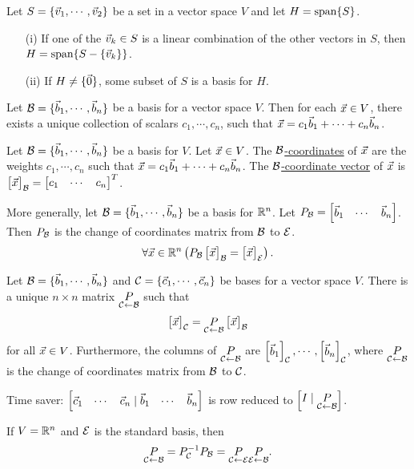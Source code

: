\documentclass[10pt,a4paper]{article}
\begin{document}
\begin{theorem}
	Let $S = \{\vec{v}_1,\cdots,\vec{v}_2\}$ be a set in a vector space $V$ and let $H = \text{span}\{S\}$.
	\begin{enumerate}
		\item[(i)] If one of the $\vec{v}_k\in S$ is a linear combination of the other vectors in $S$, then $H = \text{span}\{S - \{\vec{v}_k\}\}$.
		\item[(ii)] If $H\neq \{\vec{0}\}$, some subset of $S$ is a basis for $H$.
	\end{enumerate}
\end{theorem}

\begin{theorem}
	Let $\mathcal{B} = \{\vec{b}_1,\cdots,\vec{b}_n\}$ be a basis for a vector space $V$. Then for each $\vec{x}\in V$, there exists a unique collection of scalars $c_1,\cdots,c_n$, such that $\vec{x} = c_1 \vec{b}_1 + \cdots + c_n \vec{b}_n$.
\end{theorem}

	Let $\mathcal{B} = \{\vec{b}_1,\cdots,\vec{b}_n\}$ be a basis for $V$. Let $\vec{x} \in V$. The \underline{$\mathcal{B}$-coordinates} of $\vec{x}$ are the weights $c_1,\cdots,c_n$ such that $\vec{x} = c_1 \vec{b}_1 + \cdots + c_n \vec{b}_n$. The \underline{$\mathcal{B}$-coordinate vector} of $\vec{x}$ is $\begin{bmatrix}\vec{x}\end{bmatrix}_{\mathcal{B}} = \begin{bmatrix}c_1&\cdots&c_n\end{bmatrix}^T$.

More generally, let $\mathcal{B} = \{\vec{b}_1,\cdots,\vec{b}_n\}$ be a basis for $\mathbb{R}^n$. Let $P_{\mathcal{B}} = \begin{bmatrix}\vec{b}_1&\cdots&\vec{b}_n\end{bmatrix}$. Then $P_{\mathcal{B}}$ is the change of coordinates matrix from $\mathcal{B}$ to $\mathcal{E}$. 
$$\forall \vec{x}\in \mathbb{R}^n\left(P_{\mathcal{B}} \begin{bmatrix}\vec{x}\end{bmatrix}_{\mathcal{B}} = \begin{bmatrix}\vec{x}\end{bmatrix}_{\mathcal{E}}\right).$$

\begin{theorem}
	Let $\mathcal{B} = \{\vec{b}_1,\cdots,\vec{b}_n\}$ and $\mathcal{C} = \{\vec{c}_1,\cdots,\vec{c}_n\}$ be bases for a vector space $V$. There is a unique $n\times n$ matrix $\underset{\mathcal{C}\leftarrow \mathcal{B}}{P}$ such that $$\begin{bmatrix}\vec{x}\end{bmatrix}_{\mathcal{C}} = \underset{\mathcal{C} \leftarrow \mathcal{B}}{P} \begin{bmatrix}\vec{x}\end{bmatrix}_{\mathcal{B}}$$ for all $\vec{x}\in V$. Furthermore, the columns of $\underset{\mathcal{C}\leftarrow \mathcal{B}}{P}$ are $\begin{bmatrix}\vec{b}_1\end{bmatrix}_{\mathcal{C}},\cdots,\begin{bmatrix}\vec{b}_n\end{bmatrix}_{\mathcal{C}}$, where
	$\underset{\mathcal{C}\leftarrow \mathcal{B}}{P}$ is the change of coordinates matrix from $\mathcal{B}$ to $\mathcal{C}$.
\end{theorem}

Time saver: $\begin{bmatrix}\vec{c}_1 & \cdots & \vec{c}_n \mid \vec{b}_1 & \cdots & \vec{b}_n\end{bmatrix}$ is row reduced to $\begin{bmatrix}I \mid \underset{\mathcal{C}\leftarrow \mathcal{B}}P\end{bmatrix}$.
\begin{remark}
	If $V = \mathbb{R}^n$ and $\mathcal{E}$ is the standard basis, then $$\underset{\mathcal{C}\leftarrow \mathcal{B}}P = P^{-1}_{\mathcal{C}} P_{\mathcal{B}} = \underset{\mathcal{C}\leftarrow \mathcal{E}}P \underset{\mathcal{E}\leftarrow \mathcal{B}}P.$$
\end{remark}
\end{document}
